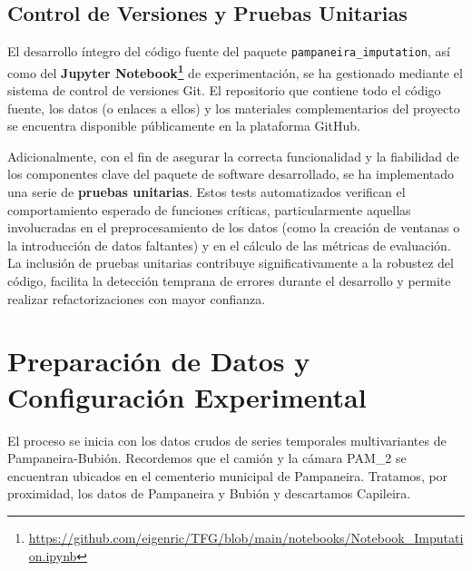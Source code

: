 \subsection{Control de Versiones y Pruebas Unitarias}
El desarrollo íntegro del código fuente del paquete \texttt{pampaneira\_imputation}, así como del \textbf{Jupyter Notebook\footnote{\url{https://github.com/eigenric/TFG/blob/main/notebooks/Notebook_Imputation.ipynb}}} de experimentación, se ha gestionado mediante el sistema de control de versiones Git. El repositorio que contiene todo el código fuente, los datos (o enlaces a ellos) y los materiales complementarios del proyecto se encuentra disponible públicamente en la plataforma GitHub.

Adicionalmente, con el fin de asegurar la correcta funcionalidad y la fiabilidad de los componentes clave del paquete de software desarrollado, se ha implementado una serie de \textbf{pruebas unitarias}. Estos tests automatizados verifican el comportamiento esperado de funciones críticas, particularmente aquellas involucradas en el preprocesamiento de los datos (como la creación de ventanas o la introducción de datos faltantes) y en el cálculo de las métricas de evaluación. La inclusión de pruebas unitarias contribuye significativamente a la robustez del código, facilita la detección temprana de errores durante el desarrollo y permite realizar refactorizaciones con mayor confianza.


\section{Preparación de Datos y Configuración Experimental}
\label{sec:data_prep_setup_revised}

El proceso se inicia con los datos crudos de series temporales multivariantes de Pampaneira-Bubión. Recordemos que el camión y la cámara PAM\_2 se encuentran ubicados en el cementerio municipal de Pampaneira. Tratamos, por proximidad, los datos de Pampaneira y Bubión y descartamos Capileira.

